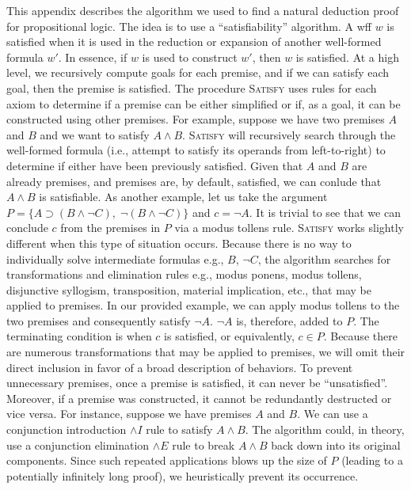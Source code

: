 \documentclass[ms]{uncgdissertationexp2}
\theoremstyle{plain}
\theoremstyle{definition}
\theoremstyle{remark}
\begin{document}
This appendix describes the algorithm we used to find a natural deduction proof for propositional logic. The idea is to use a ``satisfiability'' algorithm. A wff $w$ is satisfied when it is used in the reduction or expansion of another well-formed formula $w'$. In essence, if $w$ is used to construct $w'$, then $w$ is satisfied. At a high level, we recursively compute goals for each premise, and if we can satisfy each goal, then the premise is satisfied. The procedure \textsc{Satisfy} uses rules for each axiom to determine if a premise can be either simplified or if, as a goal, it can be constructed using other premises. For example, suppose we have two premises $A$ and $B$ and we want to satisfy $A \land B$. \textsc{Satisfy} will recursively search through the well-formed formula (i.e., attempt to satisfy its operands from left-to-right) to determine if either have been previously satisfied. Given that $A$ and $B$ are already premises, and premises are, by default, satisfied, we can conlude that $A \land B$ is satisfiable. As another example, let us take the argument $P = \{A \supset (B \land \lnot C),\;\lnot (B \land \lnot C)\}$ and $c = \lnot A$. It is trivial to see that we can conclude $c$ from the premises in $P$ via a modus tollens rule. \textsc{Satisfy} works slightly different when this type of situation occurs. Because there is no way to individually solve intermediate formulas e.g., $B$, $\lnot C$, the algorithm searches for transformations and elimination rules e.g., modus ponens, modus tollens, disjunctive syllogism, transposition, material implication, etc., that may be applied to premises. In our provided example, we can apply modus tollens to the two premises and consequently satisfy $\lnot{A}$. $\lnot{A}$ is, therefore, added to $P$. The terminating condition is when $c$ is satisfied, or equivalently, $c \in P$. Because there are numerous transformations that may be applied to premises, we will omit their direct inclusion in favor of a broad description of behaviors. To prevent unnecessary premises, once a premise is satisfied, it can never be ``unsatisfied''. Moreover, if a premise was constructed, it cannot be redundantly destructed or vice versa. For instance, suppose we have premises $A$ and $B$. We can use a conjunction introduction $\land{I}$ rule to satisfy $A \land B$. The algorithm could, in theory, use a conjunction elimination $\land{E}$ rule to break $A \land B$ back down into its original components. Since such repeated applications blows up the size of $P$ (leading to a potentially infinitely long proof), we heuristically prevent its occurrence.
\end{document}
